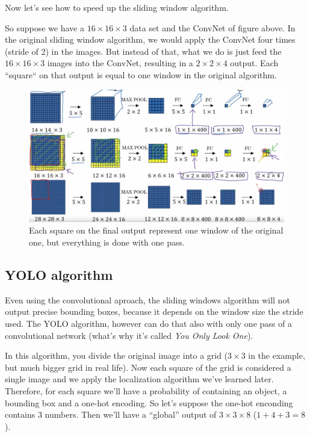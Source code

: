 \documentclass[12pt, a4paper, oneside]{book}
\begin{document}
Now let's see how to speed up the sliding window algorithm.

So suppose we have a $16\times 16\times 3$ data set and the ConvNet of figure
above. In the original sliding window algorithm, we would apply the ConvNet four
times (stride of 2) in the images. But instead of that, what we do is just feed
the $16\times 16\times 3$ images into the ConvNet, resulting in a $2\times
2\times 4$ output. Each ``square`` on that output is equal to one window in the
original algorithm.

\begin{figure}[h]
\centering
\includegraphics[scale=0.4]{Res/conv_sliding_windows.png}
\caption{Each square on the final output represent one window of the original
one, but everything is done with one pass.}
\label{conv_sliding_windows.png}
\end{figure}

\subsection{YOLO algorithm}%
\label{sub:yolo_algorithm}

Even using the convolutional aproach, the sliding windows algorithm will not
output precise bounding boxes, because it depends on the window size the stride
used. The YOLO algorithm, however can do that also with only one pass of a
convolutional network (what's why it's called \textit{You Only Look One}).

In this algorithm, you divide the original image into a grid ($3\times 3$ in the
example, but much bigger grid in real life). Now each square of the grid is
considered a single image and we apply the localization algorithm we've learned
later. Therefore, for each square we'll have a probability of containing an
object, a bounding box and a one-hot encoding. So let's suppose the one-hot
enconding contains $3$ numbers. Then we'll have a ``global'' output of $3\times
3\times 8$ ($1+4+3=8$).
\end{document}
